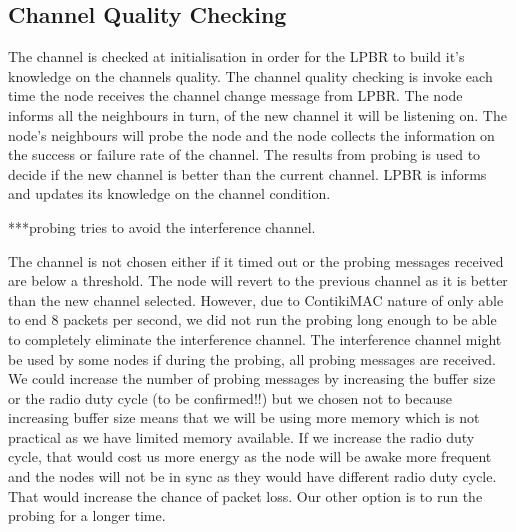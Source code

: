 



\subsection{Channel Quality Checking}

The channel is checked at initialisation in order for the LPBR to build it's knowledge on the channels quality. The channel quality checking is invoke each time the node receives the channel change message from LPBR. The node informs all the neighbours in turn, of the new channel it will be listening on. The node's neighbours will probe the node and the node collects the information on the success or failure rate of the channel. The results from probing is used to decide if the new channel is better than the current channel. LPBR is informs and updates its knowledge on the channel condition.

***probing tries to avoid the interference channel.

The channel is not chosen either if it timed out or the probing messages received are below a threshold. The node will revert to the previous channel as it is better than the new channel selected. However, due to ContikiMAC nature of only able to end 8 packets per second, we did not run the probing long enough to be able to completely eliminate the interference channel. The interference channel might be used by some nodes if during the probing, all probing messages are received. We could increase the number of probing messages by increasing the buffer size or the radio duty cycle (to be confirmed!!) but we chosen not to because increasing buffer size means that we will be using more memory which is not practical as we have limited memory available. If we increase the radio duty cycle, that would cost us more energy as the node will be awake more frequent and the nodes will not be in sync as they would have different radio duty cycle. That would increase the chance of packet loss. Our other option is to run the probing for a longer time.

